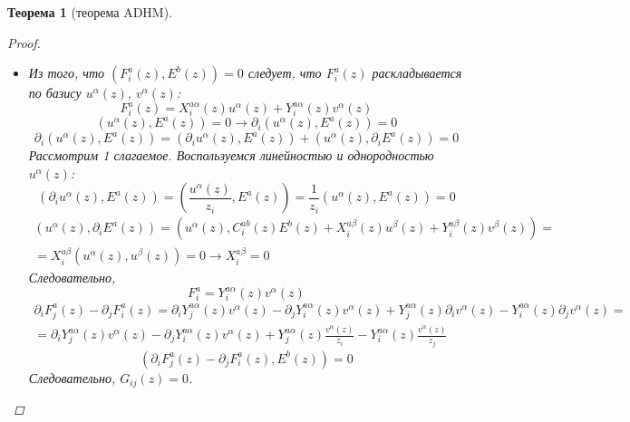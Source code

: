 \documentclass[12pt]{article}
\newtheorem{theorem}{Теорема}[section]
\theoremstyle{definition}
\begin{document}
\begin{theorem}[теорема ADHM]
\begin{proof}
\begin{itemize}
            \item[C.] Из того, что $(F^a_i(z), E^b(z)) = 0$ следует, что $F^a_i(z)$ раскладывается по базису $u^\alpha(z)$, $v^\alpha(z)$:
            \begin{equation}
                F_i^a(z)=X_i^{a\alpha}(z)u^\alpha(z)+Y_i^{a\alpha}(z)v^\alpha(z)
            \end{equation}
            \begin{equation}
                (u^\alpha(z),E^a(z))=0\rightarrow\partial_i(u^\alpha(z),E^a(z))=0
            \end{equation}
            \begin{equation}
                \partial_i(u^\alpha(z),E^a(z))=(\partial_iu^\alpha(z),E^a(z))+(u^\alpha(z),\partial_iE^a(z))=0
            \end{equation}
            Рассмотрим 1 слагаемое. Воспользуемся линейностью и однородностью $u^\alpha(z)$:
            \begin{equation}
                (\partial_iu^\alpha(z),E^a(z))=\left(\frac{u^\alpha(z)}{z_i},E^a(z)\right)=\frac{1}{z_i}(u^\alpha(z),E^a(z))=0
            \end{equation}
            \begin{multline}
                (u^\alpha(z),\partial_iE^a(z))=(u^\alpha(z),C_i^{ab}(z)E^b(z)+X_i^{a\beta}(z)u^\beta(z)+Y_i^{a\beta}(z)v^\beta(z))=\\=X_i^{a\beta}(u^\alpha(z),u^\beta(z))=0\rightarrow X_i^{a\beta}=0
            \end{multline}
            Следовательно,
            \begin{equation}
                F_i^a=Y_i^{a\alpha}(z)v^\alpha(z)
            \end{equation}
            \begin{multline}
                \partial_iF_j^a(z)-\partial_jF_i^a(z)=\partial_iY_j^{a\alpha}(z)v^\alpha(z)-\partial_jY_i^{a\alpha}(z)v^\alpha(z)+Y_j^{a\alpha}(z)\partial_iv^\alpha(z)-Y_i^{a\alpha}(z)\partial_jv^\alpha(z)=\\=\partial_iY_j^{a\alpha}(z)v^\alpha(z)-\partial_jY_i^{a\alpha}(z)v^\alpha(z)+Y_j^{a\alpha}(z)\frac{v^\alpha(z)}{z_i}-Y_i^{a\alpha}(z)\frac{v^\alpha(z)}{z_j}
            \end{multline}
            \begin{equation}
                (\partial_iF_j^a(z)-\partial_jF_i^a(z),E^b(z))=0
            \end{equation}
            Следовательно, $G_{ij}(z)=0$.
        \end{itemize}
    \end{proof}
\end{theorem}
\end{document}
